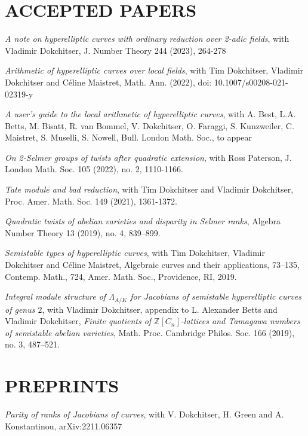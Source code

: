 \documentclass{res}
\begin{document}
\begin{resume}
\section{ACCEPTED PAPERS}         
        
\bigskip

\vspace{-0.1in}	
{\it A note on hyperelliptic curves with ordinary reduction over 2-adic fields}, with Vladimir Dokchitser, J. Number Theory 244 (2023), 264-278\

\vspace{-0.1in}	
{\it Arithmetic of hyperelliptic curves over local fields}, with Tim Dokchitser, Vladimir Dokchitser and C\'{e}line Maistret, Math. Ann. (2022), doi: 10.1007/s00208-021-02319-y  \

{\it A user's guide to the local arithmetic of hyperelliptic curves}, with A. Best, L.A. Betts, M. Bisatt, R. van Bommel, V. Dokchitser, O. Faraggi, S. Kunzweiler, C. Maistret, S. Muselli, S. Nowell,  Bull. London Math. Soc., to appear

{\it On 2-Selmer groups of twists after quadratic extension}, with Ross Paterson, J. London Math. Soc. 105 (2022), no. 2, 1110-1166. \

{\it Tate module and bad reduction}, with Tim Dokchitser and Vladimir Dokchitser, Proc. Amer. Math. Soc. 149 (2021), 1361-1372.

{\it Quadratic twists of abelian varieties and disparity in Selmer ranks},  Algebra Number Theory 13 (2019), no. 4, 839–899. \

{\it Semistable types of hyperelliptic curves}, with Tim Dokchitser, Vladimir Dokchitser and C\'{e}line Maistret, Algebraic curves and their applications, 73–135, Contemp. Math., 724, Amer. Math. Soc., Providence, RI, 2019. \

   {\it Integral module structure of $\Lambda_{A/K}$ for Jacobians of
semistable hyperelliptic curves of genus $2$}, with Vladimir Dokchitser, appendix to L. Alexander Betts and Vladimir Dokchitser, {\it Finite quotients of  $\mathbb{Z}[C_n]$-lattices and Tamagawa numbers of semistable abelian varieties}, Math. Proc. Cambridge Philos. Soc. 166 (2019), no. 3, 487–521. 
%
\section{PREPRINTS}         
        
\bigskip

{\it Parity of ranks of Jacobians of curves}, with V. Dokchitser, H. Green and A. Konstantinou, arXiv:2211.06357   


\end{resume}
\end{document}

